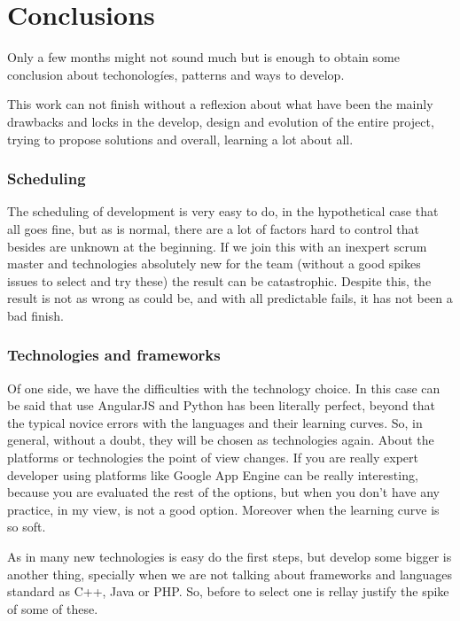 \chapter{Conclusions}

Only a few months might not sound much but is enough to obtain some
conclusion about techonologíes, patterns and ways to develop.

\begin{flushleft}
This work can not finish without a reflexion about what have been the mainly
drawbacks and locks in the develop, design and evolution of the entire project,
trying to propose solutions and overall, learning a lot about all.
\end{flushleft}

\subsection{Scheduling}

The scheduling of development is very easy to do, in the hypothetical case that
all goes fine, but as is normal, there are a lot of factors hard to control that
besides are unknown at the beginning.
If we join this with an inexpert scrum master and technologies absolutely new for
the team (without a good spikes issues to select and try these) the result can
be catastrophic.
Despite this, the result is not as wrong as could be,
and with all predictable fails, it has not been a bad finish.

\subsection{Technologies and frameworks}

Of one side, we have the difficulties with the technology choice. In this case
can be said that use AngularJS and Python has been literally perfect, beyond
that the typical novice errors with the languages and their learning curves.
So, in general, without a doubt, they will be chosen as technologies again.
\linebreak
\linebreak
\noindent About the platforms or technologies the point of view changes. If you are
really expert developer using platforms like Google App Engine can be really
interesting, because you are evaluated the rest of the options, but when
you don't have any practice, in my view, is not a good option. Moreover when
the learning curve is so soft.

\noindent As in many new technologies is easy do the first steps, but develop some bigger
is another thing, specially when we are not talking about frameworks and
languages standard as C++, Java or PHP. So, before to select one is rellay justify
the spike of some of these.

